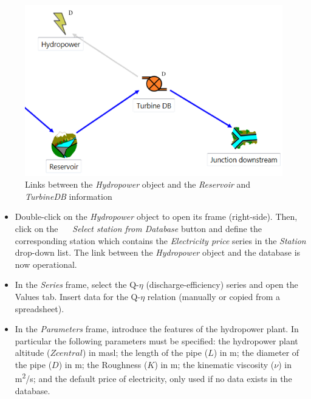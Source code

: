 \documentclass[
  letterpaper,
  DIV=11,
  numbers=noendperiod]{scrreprt}
\begin{document}
\begin{figure}

{\centering \includegraphics{./figures/fig-links_hydropower_reservoir_turbinedb.png}

}

\caption{\label{fig-links_hydropower_reservoir_turbinedb}Links between
the \emph{Hydropower} object and the \emph{Reservoir} and
\emph{TurbineDB} information}

\end{figure}

\begin{itemize}
\item
  {Double-click on the \emph{Hydropower} object to open its frame
  (right-side). Then, click on the
  \includegraphics[width=0.15in,height=0in]{./figures/fig-icon_arrow_down_menu.png}
  \emph{Select station from Database} button and define the
  corresponding station which contains the \emph{Electricity price}
  series in the \emph{Station} drop-down list. The link between the
  \emph{Hydropower} object and the database is now operational.}
\item
  {In the \emph{Series} frame, select the Q-\(\eta\)
  (discharge-efficiency) series and open the Values tab. Insert data for
  the Q-\(\eta\) relation (manually or copied from a spreadsheet).}
\item
  {In the \emph{Parameters} frame, introduce the features of the
  hydropower plant. In particular the following parameters must be
  specified: the hydropower plant altitude (\(Zcentral\)) in masl; the
  length of the pipe (\(L\)) in m; the diameter of the pipe (\(D\)) in
  m; the Roughness (\(K\)) in m; the kinematic viscosity (\(\nu\)) in
  m\textsuperscript{2}/s; and the default price of electricity, only
  used if no data exists in the database.}
\end{itemize}
\end{document}
